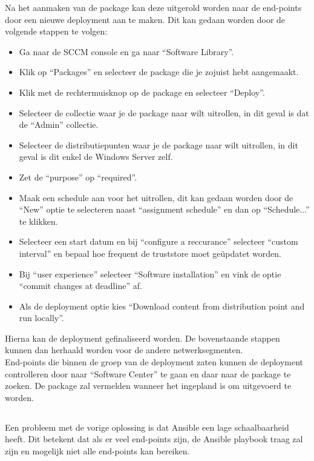 Na het aanmaken van de package kan deze uitgerold worden naar de end-points door een nieuwe deployment aan te maken. Dit kan gedaan worden door de volgende stappen te volgen:
\begin{itemize}
    \item Ga naar de SCCM console en ga naar ``Software Library''.
    \item Klik op ``Packages'' en selecteer de package die je zojuist hebt aangemaakt.
    \item Klik met de rechtermuisknop op de package en selecteer ``Deploy''.
    \item Selecteer de collectie waar je de package naar wilt uitrollen, in dit geval is dat de ``Admin'' collectie.
    \item Selecteer de distributiepunten waar je de package naar wilt uitrollen, in dit geval is dit enkel de Windows Server zelf.
    \item Zet de ``purpose'' op ``required''.
    \item Maak een schedule aan voor het uitrollen, dit kan gedaan worden door de ``New'' optie te selecteren naast ``assignment schedule'' en dan op ``Schedule...'' te klikken.
    \item Selecteer een start datum en bij ``configure a reccurance'' selecteer ``custom interval'' en bepaal hoe frequent de truststore moet geüpdatet worden.
    \item Bij ``user experience'' selecteer ``Software installation'' en vink de optie ``commit changes at deadline'' af.
    \item Als de deployment optie kies ``Download content from distribution point and run locally''.
\end{itemize}
Hierna kan de deployment gefinaliseerd worden. 
De bovenstaande stappen kunnen dan herhaald worden voor de andere netwerksegmenten. \\

End-points die binnen de groep van de deployment zaten kunnen de deployment controlleren door naar ``Software Center'' te gaan en daar naar de package te zoeken. De package zal vermelden wanneer het ingepland is om uitgevoerd te worden.

\pagebreak

\subsection{}
\label{subsec:Oplossing_voor_Linux_end-points_met_Chef_en_Vault}
Een probleem met de vorige oplossing is dat Ansible een lage schaalbaarheid heeft. Dit betekent dat als er veel end-points zijn, de Ansible playbook traag zal zijn en mogelijk niet alle end-points kan bereiken. \\

